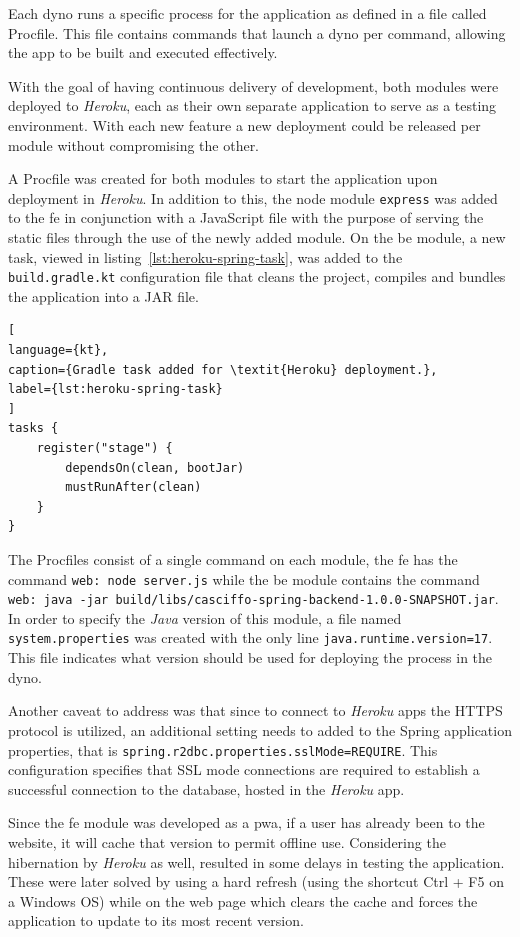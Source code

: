 Each dyno runs a specific process for the application as defined in a file called Procfile. This file contains commands that launch a dyno per command, allowing the app to be built and executed effectively.

With the goal of having continuous delivery of development, both modules were deployed to \textit{Heroku}, each as their own separate application to serve as a testing environment.
With each new feature a new deployment could be released per module without compromising the other. 

A Procfile was created for both modules to start the application upon deployment in \textit{Heroku}. In addition to this, the node module \lstinline{express} was added to the \acrshort{fe} in conjunction with a JavaScript file with the purpose of serving the static files through the use of the newly added module. On the \acrshort{be} module, a new task, viewed in listing~\ref{lst:heroku-spring-task}, was added to the \lstinline{build.gradle.kt} configuration file that cleans the project, compiles and bundles the application into a JAR file. 

\begin{lstlisting}[
language={kt},
caption={Gradle task added for \textit{Heroku} deployment.},
label={lst:heroku-spring-task}
]
tasks {
    register("stage") {
        dependsOn(clean, bootJar)
        mustRunAfter(clean)
    }
}
\end{lstlisting}


The Procfiles consist of a single command on each module, the \acrshort{fe} has the command \lstinline{web: node server.js} while the \acrshort{be} module contains the command \lstinline{web: java -jar build/libs/casciffo-spring-backend-1.0.0-SNAPSHOT.jar}. In order to specify the \textit{Java} version of this module, a file named \lstinline{system.properties} was created with the only line \lstinline{java.runtime.version=17}. This file indicates what version should be used for deploying the process in the dyno.

Another caveat to address was that since to connect to \textit{Heroku} apps the HTTPS protocol is utilized, an additional setting needs to added to the Spring application properties, that is \lstinline{spring.r2dbc.properties.sslMode=REQUIRE}. This configuration specifies that SSL mode connections are required to establish a successful connection to the database, hosted in the \textit{Heroku} app. 

Since the \acrshort{fe} module was developed as a \acrshort{pwa}, if a user has already been to the website, it will cache that version to permit offline use. Considering the hibernation by \textit{Heroku} as well, resulted in some delays in testing the application. These were later solved by using a hard refresh (using the shortcut Ctrl + F5 on a Windows OS) while on the web page which clears the cache and forces the application to update to its most recent version. 

